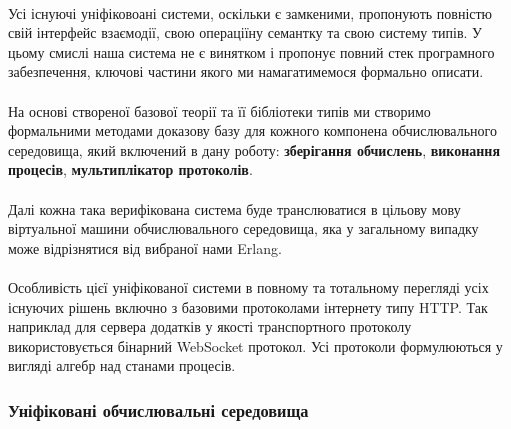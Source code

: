 \documentclass[11pt,oneside]{article}
\begin{document}
   \paragraph{}
   Усі існуючі уніфіковоані системи, оскільки є замкеними, пропонують
   повністю свій інтерфейс взаємодії, свою операціїну семантку та свою систему типів.
   У цьому смислі наша система не є винятком і пропонує повний стек
   програмного забезпечення, ключові частини якого ми намагатимемося формально
   описати.

   \paragraph{}
   На основі створеної базової теорії та її бібліотеки типів ми створимо
   формальними методами доказову базу для кожного компонена обчислювального
   середовища, який включений в дану роботу: {\bf зберігання обчислень},
   {\bf виконання процесів}, {\bf мультиплікатор протоколів}.

   \paragraph{}
   Далі кожна така верифікована система буде транслюватися в цільову мову
   віртуальної машини обчислювального середовища, яка у загальному випадку
   може відрізнятися від вибраної нами Erlang.

   \paragraph{}
   Особливість цієї уніфікованої системи в повному та тотальному перегляді
   усіх існуючих рішень включно з базовими протоколами інтернету типу HTTP.
   Так наприклад для сервера додатків у якості транспортного протоколу
   використовується бінарний WebSocket протокол. Усі протоколи формулюються
   у вигляді алгебр над станами процесів.

\subsubsection{Уніфіковані обчислювальні середовища}
\end{document}
